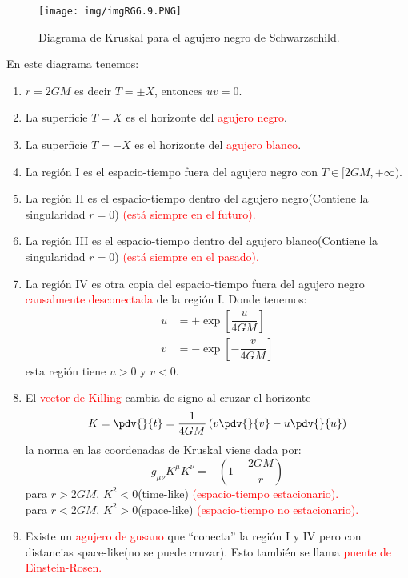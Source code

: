 \documentclass[../main]{subfiles}
\begin{document}
\begin{figure}[h]
    \centering
    \texttt{[image: img/imgRG6.9.PNG]}
    \caption{Diagrama de Kruskal para el agujero negro de Schwarzschild.}
\end{figure}

En este diagrama tenemos:
\begin{enumerate}
    \item $r=2GM$ es decir $T=\pm X$, entonces $uv=0$.
    \item La superficie $T=X$ es el horizonte del \textcolor{red}{agujero negro}.
    \item La superficie $T=-X$ es el horizonte del \textcolor{red}{agujero blanco}.
    \item La región I es el espacio-tiempo fuera del agujero negro con $T \in [2GM, +\infty)$.
    \item La región II es el espacio-tiempo dentro del agujero negro(Contiene la singularidad $r=0$) \textcolor{red}{(está siempre en el futuro).}
    \item La región III es el espacio-tiempo dentro del agujero blanco(Contiene la singularidad $r=0$) \textcolor{red}{(está siempre en el pasado).}
    \item La región IV es otra copia del espacio-tiempo fuera del agujero negro \textcolor{red}{causalmente desconectada} de la región I. Donde tenemos:
    \begin{align}
        u&=+\exp\left[\dfrac{u}{4GM}\right]\\
        v&=-\exp\left[-\dfrac{v}{4GM}\right]
    \end{align}
    esta región tiene $u>0$ y $v<0$.
    \item El \textcolor{red}{vector de Killing} cambia de signo al cruzar el horizonte 
    \begin{equation}
        K=\pdv{}{t}=\dfrac{1}{4GM}\left(v\pdv{}{v}-u\pdv{}{u}\right)
    \end{equation}
    la norma en las coordenadas de Kruskal viene dada por:
    \begin{equation}
        g_{\mu\nu}K^{\mu}K^{\nu}=-\left(1-\dfrac{2GM}{r}\right)
    \end{equation}
    para $r>2GM$, $K^2<0$(time-like) \textcolor{red}{(espacio-tiempo estacionario).}\\
    para $r<2GM$, $K^2>0$(space-like) \textcolor{red}{(espacio-tiempo no estacionario).}
    \item Existe un \textcolor{red}{agujero de gusano} que ``conecta'' la región I y IV pero con distancias space-like(no se puede cruzar). Esto también se llama \textcolor{red}{puente de Einstein-Rosen.}
\end{enumerate}
\end{document}
